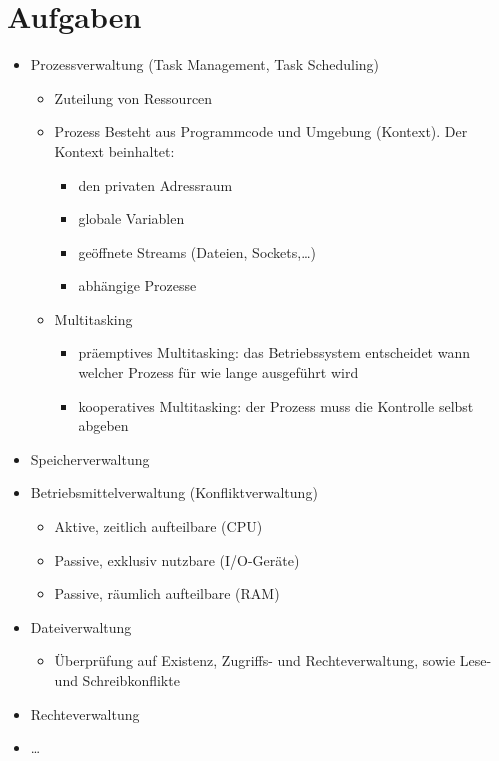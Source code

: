 \section{Aufgaben}
\begin{itemize}
  \item {}
	Prozessverwaltung (Task Management, Task Scheduling)
  \begin{itemize}
    \item Zuteilung von Ressourcen
    \item Prozess Besteht aus Programmcode und Umgebung (Kontext). Der Kontext beinhaltet:
	  \begin{itemize}
	    \item den privaten Adressraum
	    \item globale Variablen
	    \item geöffnete Streams (Dateien, Sockets,\ldots{})
	    \item abhängige Prozesse
	  \end{itemize}
    \item {}
	  Multitasking
	  \begin{itemize}
	    \item {}
		  präemptives Multitasking: das Betriebssystem entscheidet wann welcher Prozess für wie lange ausgeführt wird
	    \item {}
		  kooperatives Multitasking: der Prozess muss die Kontrolle selbst abgeben
	  \end{itemize}
  \end{itemize}
  \item {}
	Speicherverwaltung
  \item {}
	Betriebsmittelverwaltung (Konfliktverwaltung)
	\begin{itemize}
	  \item Aktive, zeitlich aufteilbare (CPU)
	  \item Passive, exklusiv nutzbare (I/O-Geräte)
	  \item Passive, räumlich aufteilbare (RAM)
	\end{itemize}
  \item {}
	Dateiverwaltung
	\begin{itemize}
	  \item Überprüfung auf Existenz, Zugriffs- und Rechteverwaltung, sowie Lese- und Schreibkonflikte
	\end{itemize}
  \item {}
	Rechteverwaltung
  \item \ldots{}
\end{itemize}

